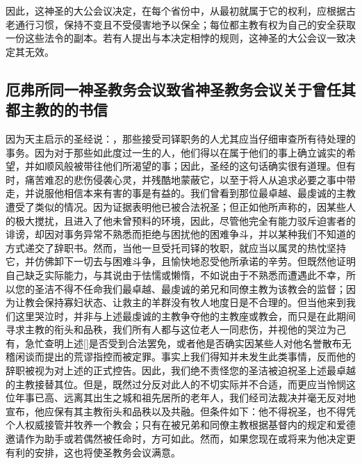 因此，这神圣的大公会议决定，在每个省份中，从最初就属于它的权利，应根据古老通行习惯，保持不变且不受侵害地予以保全；每位都主教有权为自己的安全获取一份这些法令的副本。若有人提出与本决定相悖的规则，这神圣的大公会议一致决定其无效。\par


\subsection{厄弗所同一神圣教务会议致省神圣教务会议关于曾任其都主教的的书信}

因为天主启示的圣经说：，那些接受司铎职务的人尤其应当仔细审查所有待处理的事务。因为对于那些如此度过一生的人，他们得以在属于他们的事上确立诚实的希望，并如顺风般被带往他们所渴望的事；因此，圣经的这句话确实很有道理。但有时，痛苦难忍的悲伤侵袭心灵，并残酷地蒙蔽它，以至于将人从追求必要之事中带走，并说服他相信本来有害的事是有益的。我们曾看到那位最卓越、最虔诚的主教遭受了类似的情况。因为证据表明他已被合法祝圣；但正如他所声称的，因某些人的极大搅扰，且进入了他未曾预料的环境，因此，尽管他完全有能力驳斥迫害者的诽谤，却因对事务异常不熟悉而拒绝与困扰他的困难争斗，并以某种我们不知道的方式递交了辞职书。然而，当他一旦受托司铎的牧职，就应当以属灵的热忱坚持它，并仿佛卸下一切去与困难斗争，且愉快地忍受他所承诺的辛劳。但既然他证明自己缺乏实际能力，与其说由于怯懦或懒惰，不如说由于不熟悉而遭遇此不幸，所以您的圣洁不得不任命我们最卓越、最虔诚的弟兄和同僚主教为该教会的监督；因为让教会保持寡妇状态、让救主的羊群没有牧人地度日是不合理的。但当他来到我们这里哭泣时，并非与上述最虔诚的主教争夺他的主教座或教会，而只是在此期间寻求主教的衔头和品秩，我们所有人都与这位老人一同悲伤，并视他的哭泣为己有，急忙查明上述[]是否受到合法罢免，或者他是否确实因某些人对他名誉散布无稽闲谈而提出的荒谬指控而被定罪。事实上我们得知并未发生此类事情，反而他的辞职被视为对上述的正式控告。因此，我们绝不责怪您的圣洁被迫祝圣上述最卓越的主教接替其位。但是，既然过分反对此人的不切实际并不合适，而更应当怜悯这位年事已高、远离其出生之城和祖先居所的老年人，我们经司法裁决并毫无反对地宣布，他应保有其主教衔头和品秩以及共融。但条件如下：他不得祝圣，也不得凭个人权威接管并牧养一个教会；只有在被兄弟和同僚主教根据基督内的规定和爱德邀请作为助手或若偶然被任命时，方可如此。然而，如果您现在或将来为他决定更有利的安排，这也将使圣教务会议满意。\par

